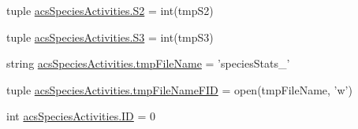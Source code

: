 \begin{DoxyCompactItemize}
\item 
tuple \hyperlink{a00097_a3b95f66d848ccbac2740be2878b2499b}{acs\-Species\-Activities.\-S2} = int(tmp\-S2)
\item 
tuple \hyperlink{a00097_a654d2a657cf4b354b3791a8b2de3d74e}{acs\-Species\-Activities.\-S3} = int(tmp\-S3)
\item 
string \hyperlink{a00097_a23844a8104156ee329f8c957f11490f4}{acs\-Species\-Activities.\-tmp\-File\-Name} = 'species\-Stats\-\_\-'
\item 
tuple \hyperlink{a00097_addb867cf8533f2e18682c49f08f47bba}{acs\-Species\-Activities.\-tmp\-File\-Name\-F\-I\-D} = open(tmp\-File\-Name, 'w')
\item 
int \hyperlink{a00097_a8102909ea2c113190493bd581f17ba18}{acs\-Species\-Activities.\-I\-D} = 0
\end{DoxyCompactItemize}
